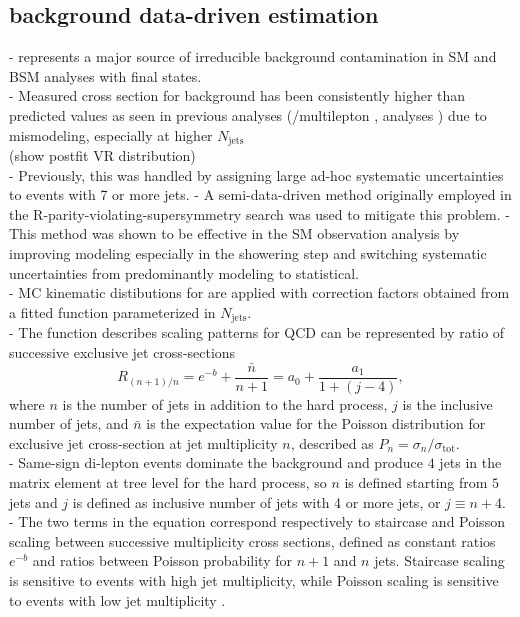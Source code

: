 \documentclass[../thesis.tex]{subfiles}
\begin{document}
\subsection{\ttW background data-driven estimation}
- \ttW represents a major source of irreducible background contamination in SM and BSM analyses with \tttt final states.\\
- Measured cross section for \ttW background has been consistently higher than predicted values as seen in previous analyses (\ttH/\ttW multilepton \citep{bg:ttH_ttW_ML}\cite{ana:ttW_meas}, \tttt analyses \citep{tttt_evidence}\citep{tttt_obs}) due to mismodeling, especially at higher $N_\mathrm{jets}$ \\
(show postfit \ttW VR distribution)\\
- Previously, this was handled by assigning large ad-hoc systematic uncertainties to \ttW events with 7 or more jets. 
- A semi-data-driven method originally employed in the R-parity-violating-supersymmetry search \citep{ana:r_par_susy_2021} was used to mitigate this problem. 
- This method was shown to be effective in the SM \tttt observation analysis \citep{ana:tttt_obs} by improving \ttW modeling especially in the showering step and switching \ttW systematic uncertainties from predominantly modeling to statistical.\\
- MC kinematic distibutions for \ttW are applied with correction factors obtained from a fitted function parameterized in $N_\mathrm{jets}$.\\
- The function describes scaling patterns for QCD \citep{bg:qcd_scaling} can be represented by ratio of successive exclusive jet cross-sections
\begin{equation}
R_{(n+1)/n} = e^{-b} + \frac{\bar{n}}{n+1} = a_0 + \frac{a_1}{1+(j-4)},
\end{equation}
where $n$ is the number of jets in addition to the hard process, $j$ is the inclusive number of jets, and $\bar{n}$ is the expectation value for the Poisson distribution for exclusive jet cross-section at jet multiplicity $n$, described as $P_n=\sigma_n/\sigma_\mathrm{tot}$.\\
- Same-sign di-lepton \ttW events dominate the \ttW background and produce $4$ jets in the matrix element at tree level for the hard process, so $n$ is defined starting from $5$ jets and $j$ is defined as inclusive number of jets with 4 or more jets, or $j\equiv n+4$.\\
- The two terms in the equation correspond respectively to staircase and Poisson scaling between successive multiplicity cross sections, defined as constant ratios $e^{-b}$ and ratios between Poisson probability for $n+1$ and $n$ jets. Staircase scaling is sensitive to events with high jet multiplicity, while Poisson scaling is sensitive to events with low jet multiplicity \citep{bg:qcd_scaling}.\\
\end{document}
